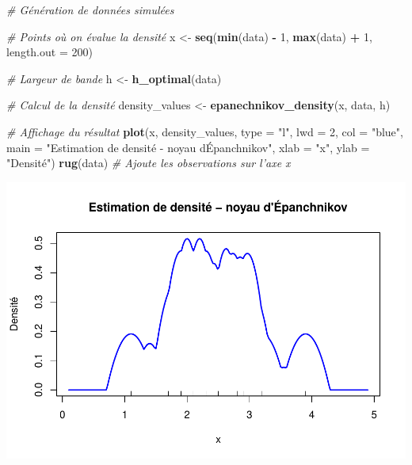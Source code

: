 \documentclass[
  12pt,
]{article}
\newenvironment{Shaded}{\begin{snugshade}}{\end{snugshade}}
\newcommand{\AttributeTok}[1]{\textcolor[rgb]{0.13,0.29,0.53}{#1}}
\newcommand{\CommentTok}[1]{\textcolor[rgb]{0.56,0.35,0.01}{\textit{#1}}}
\newcommand{\DecValTok}[1]{\textcolor[rgb]{0.00,0.00,0.81}{#1}}
\newcommand{\FunctionTok}[1]{\textcolor[rgb]{0.13,0.29,0.53}{\textbf{#1}}}
\newcommand{\NormalTok}[1]{#1}
\newcommand{\OtherTok}[1]{\textcolor[rgb]{0.56,0.35,0.01}{#1}}
\newcommand{\SpecialCharTok}[1]{\textcolor[rgb]{0.81,0.36,0.00}{\textbf{#1}}}
\newcommand{\StringTok}[1]{\textcolor[rgb]{0.31,0.60,0.02}{#1}}
\begin{document}
\begin{Shaded}
\begin{Highlighting}[]
\CommentTok{\# Génération de données simulées}


\CommentTok{\# Points où on évalue la densité}
\NormalTok{x }\OtherTok{\textless{}{-}} \FunctionTok{seq}\NormalTok{(}\FunctionTok{min}\NormalTok{(data) }\SpecialCharTok{{-}} \DecValTok{1}\NormalTok{, }\FunctionTok{max}\NormalTok{(data) }\SpecialCharTok{+} \DecValTok{1}\NormalTok{, }\AttributeTok{length.out =} \DecValTok{200}\NormalTok{)}

\CommentTok{\# Largeur de bande}
\NormalTok{h }\OtherTok{\textless{}{-}} \FunctionTok{h\_optimal}\NormalTok{(data)}

\CommentTok{\# Calcul de la densité}
\NormalTok{density\_values }\OtherTok{\textless{}{-}} \FunctionTok{epanechnikov\_density}\NormalTok{(x, data, h)}

\CommentTok{\# Affichage du résultat}
\FunctionTok{plot}\NormalTok{(x, density\_values, }\AttributeTok{type =} \StringTok{"l"}\NormalTok{, }\AttributeTok{lwd =} \DecValTok{2}\NormalTok{, }\AttributeTok{col =} \StringTok{"blue"}\NormalTok{,}
     \AttributeTok{main =} \StringTok{"Estimation de densité {-} noyau d\textquotesingle{}Épanchnikov"}\NormalTok{,}
     \AttributeTok{xlab =} \StringTok{"x"}\NormalTok{, }\AttributeTok{ylab =} \StringTok{"Densité"}\NormalTok{)}
\FunctionTok{rug}\NormalTok{(data)  }\CommentTok{\# Ajoute les observations sur l’axe x}
\end{Highlighting}
\end{Shaded}

\includegraphics{Stat_non_para_files/figure-latex/unnamed-chunk-183-1.pdf}
\end{document}
